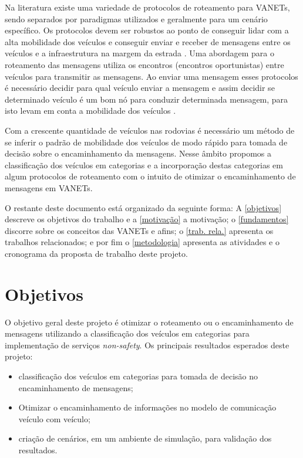 \documentclass[mestrado, pre-defesa, english, brazil]{packages/icmc}
\begin{document}
Na literatura existe uma variedade de protocolos de roteamento para VANETs, sendo separados por paradigmas utilizados e geralmente para um cenário específico. Os protocolos devem ser robustos ao ponto de conseguir lidar com a alta mobilidade dos veículos e conseguir enviar e receber de mensagens entre os veículos e a infraestrutura na margem da estrada \cite{Alves-2009}. Uma abordagem para o roteamento das mensagens utiliza os encontros (encontros oportunistas) entre veículos para transmitir as mensagens. Ao enviar uma mensagem esses protocolos é necessário decidir para qual veículo enviar a mensagem e assim decidir se determinado veículo é um bom nó para conduzir determinada mensagem, para isto levam em conta a mobilidade dos veículos \cite{costa-2013}.

Com a crescente quantidade de veículos nas rodovias é necessário um método de se inferir o padrão de mobilidade dos veículos de modo rápido para tomada de decisão sobre o encaminhamento da mensagens. Nesse âmbito propomos a classificação dos veículos em categorias e a incorporação destas categorias em algum protocolos de roteamento com o intuito de otimizar o encaminhamento de mensagens em VANETs.

O restante deste documento está organizado da seguinte forma: A \autoref{objetivos} descreve os objetivos do trabalho e a \autoref{motivação} a motivação; o \autoref{fundamentos} discorre sobre os conceitos das VANETs e afins; o \autoref{trab. rela.} apresenta os trabalhos relacionados; e por fim o \autoref{metodologia} apresenta as atividades e o cronograma da proposta de trabalho deste projeto.

\section{Objetivos} \label{objetivos}

O objetivo geral deste projeto é otimizar o roteamento ou o encaminhamento de mensagens utilizando a classificação dos veículos em categorias para implementação de serviços \textit{non-safety}. Os principais resultados esperados deste projeto:

\begin{itemize}
    \item classificação dos veículos em categorias para tomada de decisão no encaminhamento de mensagens;
    \item Otimizar o encaminhamento de informações no modelo de comunicação veículo com veículo;
    \item criação de cenários, em um ambiente de simulação, para validação dos resultados.
\end{itemize}
\end{document}
